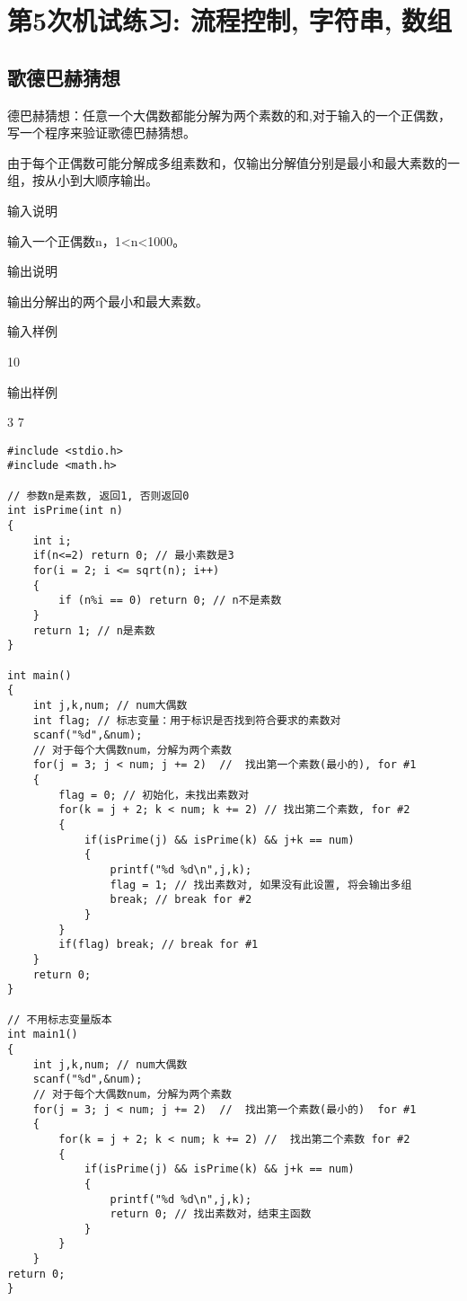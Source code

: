 %
%
%
\chapter{第5次机试练习: 流程控制, 字符串, 数组}

\section{歌德巴赫猜想}
德巴赫猜想：任意一个大偶数都能分解为两个素数的和,对于输入的一个正偶数，写一个程序来验证歌德巴赫猜想。

由于每个正偶数可能分解成多组素数和，仅输出分解值分别是最小和最大素数的一组，按从小到大顺序输出。

输入说明	

输入一个正偶数n，1<n<1000。

输出说明
	
输出分解出的两个最小和最大素数。

输入样例
	
10

输出样例
	
3 7

\begin{lstlisting}
#include <stdio.h>
#include <math.h>

// 参数n是素数, 返回1, 否则返回0
int isPrime(int n)
{
	int i;
	if(n<=2) return 0; // 最小素数是3 
	for(i = 2; i <= sqrt(n); i++) 
	{
		if (n%i == 0) return 0; // n不是素数 
	}
	return 1; // n是素数 
}

int main()
{
	int j,k,num; // num大偶数 
	int flag; // 标志变量：用于标识是否找到符合要求的素数对
	scanf("%d",&num);
	// 对于每个大偶数num，分解为两个素数 
	for(j = 3; j < num; j += 2)  //  找出第一个素数(最小的), for #1 
	{
		flag = 0; // 初始化，未找出素数对 
		for(k = j + 2; k < num; k += 2) // 找出第二个素数, for #2
		{
			if(isPrime(j) && isPrime(k) && j+k == num) 
			{
				printf("%d %d\n",j,k);
				flag = 1; // 找出素数对, 如果没有此设置, 将会输出多组 
				break; // break for #2
			}
		}
		if(flag) break; // break for #1 
	}
	return 0;
}

// 不用标志变量版本 
int main1()
{
	int j,k,num; // num大偶数 
	scanf("%d",&num);
	// 对于每个大偶数num，分解为两个素数 
	for(j = 3; j < num; j += 2)  //  找出第一个素数(最小的)  for #1 
	{
		for(k = j + 2; k < num; k += 2) //  找出第二个素数 for #2
		{
			if(isPrime(j) && isPrime(k) && j+k == num) 
			{
				printf("%d %d\n",j,k);
				return 0; // 找出素数对，结束主函数 
			}
		}
	}
return 0;
}
\end{lstlisting}

